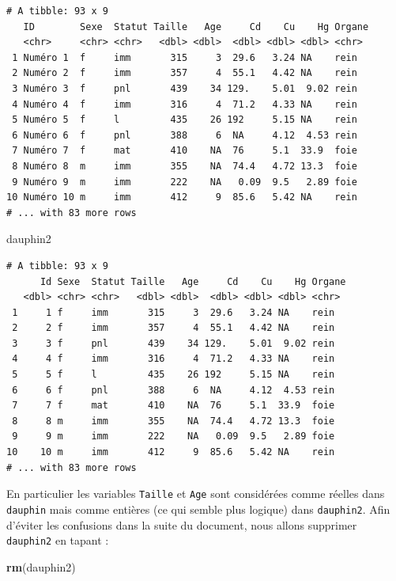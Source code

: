 \documentclass[a4paperpaper,]{article}
\newenvironment{Shaded}{\begin{snugshade}}{\end{snugshade}}
\newcommand{\KeywordTok}[1]{\textcolor[rgb]{0.12,0.11,0.11}{\textbf{#1}}}
\newcommand{\NormalTok}[1]{\textcolor[rgb]{0.12,0.11,0.11}{#1}}
\begin{document}
\begin{verbatim}
# A tibble: 93 x 9
   ID        Sexe  Statut Taille   Age     Cd    Cu    Hg Organe
   <chr>     <chr> <chr>   <dbl> <dbl>  <dbl> <dbl> <dbl> <chr> 
 1 Numéro 1  f     imm       315     3  29.6   3.24 NA    rein  
 2 Numéro 2  f     imm       357     4  55.1   4.42 NA    rein  
 3 Numéro 3  f     pnl       439    34 129.    5.01  9.02 rein  
 4 Numéro 4  f     imm       316     4  71.2   4.33 NA    rein  
 5 Numéro 5  f     l         435    26 192     5.15 NA    rein  
 6 Numéro 6  f     pnl       388     6  NA     4.12  4.53 rein  
 7 Numéro 7  f     mat       410    NA  76     5.1  33.9  foie  
 8 Numéro 8  m     imm       355    NA  74.4   4.72 13.3  foie  
 9 Numéro 9  m     imm       222    NA   0.09  9.5   2.89 foie  
10 Numéro 10 m     imm       412     9  85.6   5.42 NA    rein  
# ... with 83 more rows
\end{verbatim}

\begin{Shaded}
\begin{Highlighting}[]
\NormalTok{dauphin2}
\end{Highlighting}
\end{Shaded}

\begin{verbatim}
# A tibble: 93 x 9
      Id Sexe  Statut Taille   Age     Cd    Cu    Hg Organe
   <dbl> <chr> <chr>   <dbl> <dbl>  <dbl> <dbl> <dbl> <chr> 
 1     1 f     imm       315     3  29.6   3.24 NA    rein  
 2     2 f     imm       357     4  55.1   4.42 NA    rein  
 3     3 f     pnl       439    34 129.    5.01  9.02 rein  
 4     4 f     imm       316     4  71.2   4.33 NA    rein  
 5     5 f     l         435    26 192     5.15 NA    rein  
 6     6 f     pnl       388     6  NA     4.12  4.53 rein  
 7     7 f     mat       410    NA  76     5.1  33.9  foie  
 8     8 m     imm       355    NA  74.4   4.72 13.3  foie  
 9     9 m     imm       222    NA   0.09  9.5   2.89 foie  
10    10 m     imm       412     9  85.6   5.42 NA    rein  
# ... with 83 more rows
\end{verbatim}

En particulier les variables \texttt{Taille} et \texttt{Age} sont considérées comme réelles dans \texttt{dauphin} mais comme entières (ce qui semble plus logique) dans \texttt{dauphin2}. Afin d'éviter les confusions dans la suite du document, nous allons supprimer \texttt{dauphin2} en tapant :

\begin{Shaded}
\begin{Highlighting}[]
\KeywordTok{rm}\NormalTok{(dauphin2)}
\end{Highlighting}
\end{Shaded}
\end{document}
